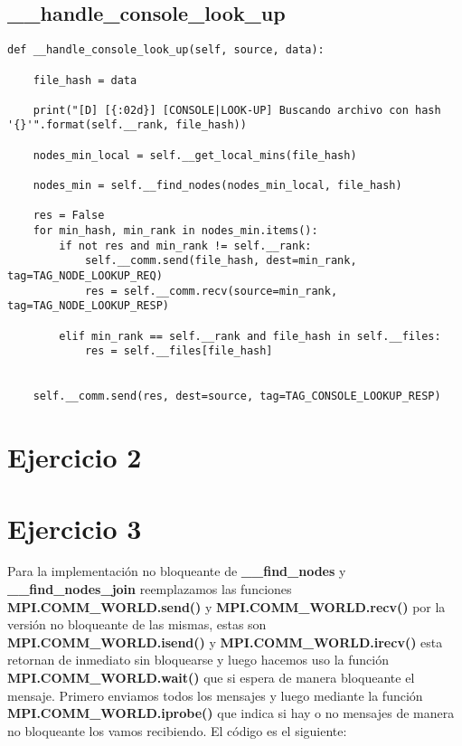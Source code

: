 \subsection{\_\_handle\_console\_look\_up}

\begin{lstlisting}
def __handle_console_look_up(self, source, data):

    file_hash = data

    print("[D] [{:02d}] [CONSOLE|LOOK-UP] Buscando archivo con hash '{}'".format(self.__rank, file_hash))

    nodes_min_local = self.__get_local_mins(file_hash)

    nodes_min = self.__find_nodes(nodes_min_local, file_hash)

    res = False
    for min_hash, min_rank in nodes_min.items():
        if not res and min_rank != self.__rank:
            self.__comm.send(file_hash, dest=min_rank, tag=TAG_NODE_LOOKUP_REQ)
            res = self.__comm.recv(source=min_rank, tag=TAG_NODE_LOOKUP_RESP)
        
        elif min_rank == self.__rank and file_hash in self.__files:
            res = self.__files[file_hash]


    self.__comm.send(res, dest=source, tag=TAG_CONSOLE_LOOKUP_RESP)
\end{lstlisting}

\section{Ejercicio 2}

\section{Ejercicio 3}
Para la implementación no bloqueante de \textbf{\_\_find\_nodes} y  \textbf{\_\_find\_nodes\_join} reemplazamos las funciones \textbf{MPI.COMM\_WORLD.send()} y \textbf{MPI.COMM\_WORLD.recv()} por la versión no bloqueante de las mismas, estas son \textbf{MPI.COMM\_WORLD.isend()} y \textbf{MPI.COMM\_WORLD.irecv()} esta retornan de inmediato sin bloquearse y luego hacemos uso la función \textbf{MPI.COMM\_WORLD.wait()} que si espera de manera bloqueante el mensaje. Primero enviamos todos los mensajes y luego mediante la función \textbf{MPI.COMM\_WORLD.iprobe()} que indica si hay o no mensajes de manera no bloqueante los vamos recibiendo. El código es el siguiente:

